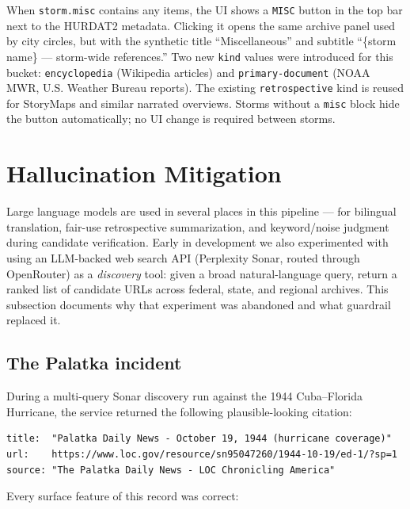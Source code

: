 \documentclass[11pt,letterpaper]{article}
\begin{document}
When \texttt{storm.misc} contains any items, the UI shows a \texttt{MISC} button in the top bar next to the HURDAT2 metadata. Clicking it opens the same archive panel used by city circles, but with the synthetic title ``Miscellaneous'' and subtitle ``\{storm name\} --- storm-wide references.'' Two new \texttt{kind} values were introduced for this bucket: \texttt{encyclopedia} (Wikipedia articles) and \texttt{primary-document} (NOAA MWR, U.S. Weather Bureau reports). The existing \texttt{retrospective} kind is reused for StoryMaps and similar narrated overviews. Storms without a \texttt{misc} block hide the button automatically; no UI change is required between storms.

\section{Hallucination Mitigation}
\label{sec:hallucination}

Large language models are used in several places in this pipeline --- for bilingual translation, fair-use retrospective summarization, and keyword/noise judgment during candidate verification. Early in development we also experimented with using an LLM-backed web search API (Perplexity Sonar, routed through OpenRouter) as a \emph{discovery} tool: given a broad natural-language query, return a ranked list of candidate URLs across federal, state, and regional archives. This subsection documents why that experiment was abandoned and what guardrail replaced it.

\subsection{The Palatka incident}

During a multi-query Sonar discovery run against the 1944 Cuba--Florida Hurricane, the service returned the following plausible-looking citation:

\begin{lstlisting}[caption={The hallucinated citation}]
title:  "Palatka Daily News - October 19, 1944 (hurricane coverage)"
url:    https://www.loc.gov/resource/sn95047260/1944-10-19/ed-1/?sp=1
source: "The Palatka Daily News - LOC Chronicling America"
\end{lstlisting}

Every surface feature of this record was correct:
\end{document}
